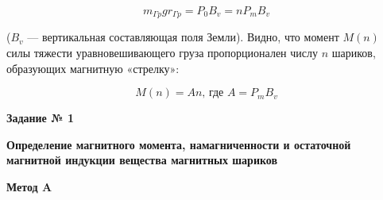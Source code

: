 \documentclass[a4paper, 12pt]{article}
\begin{document}
  \begin{center}
\begin{equation}
m_{\Gamma p} g r_{\Gamma p}=P_{0} B_{v}=n P_{m} B_{v}
\end{equation}
\end{center}
($B_v$ — вертикальная составляющая поля Земли). Видно, что момент $M(n)$ силы тяжести уравновешивающего груза пропорционален числу $n$ шариков, образующих магнитную «стрелку»:

  \begin{center}
\begin{equation}
M(n)=A n \text {, где } A=P_{m} B_{v}
\end{equation}
\end{center}

\large{\textbf{Задание № 1}}

\textbf{Определение магнитного момента, намагниченности и остаточной магнитной индукции вещества магнитных шариков}

\large{\textbf{Метод A}}
\end{document}
